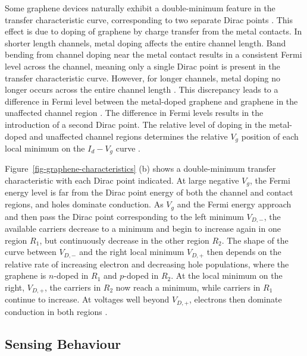 \documentclass[
  a4paper,
]{scrbook}
\begin{document}
Some graphene devices naturally exhibit a double-minimum feature in the
transfer characteristic curve, corresponding to two separate Dirac
points \autocite{Bartolomeo2011,Feng2014,Zhang2015,Kireev2017,Peng2018}.
This effect is due to doping of graphene by charge transfer from the
metal contacts. In shorter length channels, metal doping affects the
entire channel length. Band bending from channel doping near the metal
contact results in a consistent Fermi level across the channel, meaning
only a single Dirac point is present in the transfer characteristic
curve. However, for longer channels, metal doping no longer occurs
across the entire channel length \autocite{Bartolomeo2011,Peng2018}.
This discrepancy leads to a difference in Fermi level between the
metal-doped graphene and graphene in the unaffected channel region
\autocite{Bartolomeo2011,Feng2014,Peng2018,Zhang2015}. The difference in
Fermi levels results in the introduction of a second Dirac point. The
relative level of doping in the metal-doped and unaffected channel
regions determines the relative \(V_g\) position of each local minimum
on the \(I_d - V_g\) curve \autocite{Bartolomeo2011,Peng2018,Zhang2015}.

Figure~\ref{fig-graphene-characteristics} (b) shows a double-minimum
transfer characteristic with each Dirac point indicated. At large
negative \(V_g\), the Fermi energy level is far from the Dirac point
energy of both the channel and contact regions, and holes dominate
conduction. As \(V_g\) and the Fermi energy approach and then pass the
Dirac point corresponding to the left minimum \(V_{D,-}\), the available
carriers decrease to a minimum and begin to increase again in one region
\(R_1\), but continuously decrease in the other region \(R_2\). The
shape of the curve between \(V_{D,-}\) and the right local minimum
\(V_{D,+}\) then depends on the relative rate of increasing electron and
decreasing hole populations, where the graphene is \(n\)-doped in
\(R_1\) and \(p\)-doped in \(R_2\). At the local minimum on the right,
\(V_{D,+}\), the carriers in \(R_2\) now reach a minimum, while carriers
in \(R_1\) continue to increase. At voltages well beyond \(V_{D,+}\),
electrons then dominate conduction in both regions
\autocite{Bartolomeo2011,Zhang2015,Peng2018}.

\hypertarget{sensing-behaviour}{%
\subsection{Sensing Behaviour}\label{sensing-behaviour}}
\end{document}
